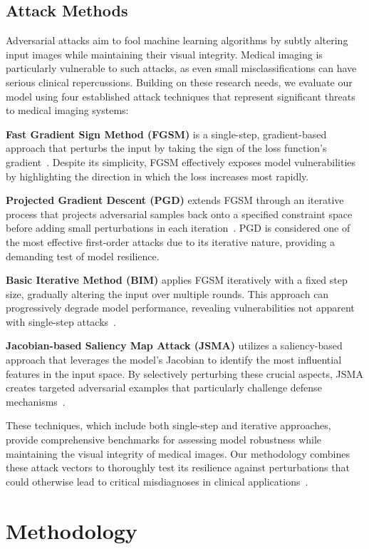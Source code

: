\documentclass[preprint,12pt]{elsarticle}
\begin{document}
\subsection{Attack Methods}
Adversarial attacks aim to fool machine learning algorithms by subtly altering input images while maintaining their visual integrity. Medical imaging is particularly vulnerable to such attacks, as even small misclassifications can have serious clinical repercussions. Building on these research needs, we evaluate our model using four established attack techniques that represent significant threats to medical imaging systems:

\textbf{Fast Gradient Sign Method (FGSM)} is a single-step, gradient-based approach that perturbs the input by taking the sign of the loss function's gradient~\cite{Lee21}. Despite its simplicity, FGSM effectively exposes model vulnerabilities by highlighting the direction in which the loss increases most rapidly.

\textbf{Projected Gradient Descent (PGD)} extends FGSM through an iterative process that projects adversarial samples back onto a specified constraint space before adding small perturbations in each iteration~\cite{Deng24}. PGD is considered one of the most effective first-order attacks due to its iterative nature, providing a demanding test of model resilience.

\textbf{Basic Iterative Method (BIM)} applies FGSM iteratively with a fixed step size, gradually altering the input over multiple rounds. This approach can progressively degrade model performance, revealing vulnerabilities not apparent with single-step attacks~\cite{Li22}.

\textbf{Jacobian-based Saliency Map Attack (JSMA)} utilizes a saliency-based approach that leverages the model's Jacobian to identify the most influential features in the input space. By selectively perturbing these crucial aspects, JSMA creates targeted adversarial examples that particularly challenge defense mechanisms~\cite{Yu24}.

These techniques, which include both single-step and iterative approaches, provide comprehensive benchmarks for assessing model robustness while maintaining the visual integrity of medical images. Our methodology combines these attack vectors to thoroughly test its resilience against perturbations that could otherwise lead to critical misdiagnoses in clinical applications~\cite{Wang22, Esmaeili23}.

\section{Methodology}
\label{sec:methodology}
\end{document}
